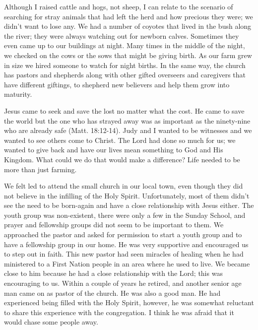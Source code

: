 \documentclass[twoside, 12pt]{book}
\begin{document}
Although I raised cattle and hogs, not sheep, I can relate to the scenario of searching for stray animals that had left the herd and how precious they were; we didn’t want to lose any. We had a number of coyotes that lived in the bush along the river; they were always watching out for newborn calves. Sometimes they even came up to our buildings at night. Many times in the middle of the night, we checked on the cows or the sows that might be giving birth. As our farm grew in size we hired someone to watch for night births. In the same way, the church has pastors and shepherds along with other gifted overseers and caregivers that have different giftings, to shepherd new believers and help them grow into maturity.

Jesus came to seek and save the lost no matter what the cost. He came to save the world but the one who has strayed away was as important as the ninety-nine who are already safe (Matt. 18:12-14). Judy and I wanted to be witnesses and we wanted to see others come to Christ. The Lord had done so much for us; we wanted to give back and have our lives mean something to God and His Kingdom. What could we do that would make a difference? Life needed to be more than just farming.

We felt led to attend the small church in our local town, even though they did not believe in the infilling of the Holy Spirit. Unfortunately, most of them didn't see the need to be born-again and have a close relationship with Jesus either. The youth group was non-existent, there were only a few in the Sunday School, and  prayer and fellowship groups did not seem to be important to them. We approached the pastor and asked for permission to start a youth group and to have a fellowship group in our home. He was very supportive and encouraged us to step out in faith. This new pastor had seen miracles of healing when he had ministered to a First Nation people in an area where he used to live. We became close to him because he had a close relationship with the Lord; this was encouraging to us. Within a couple of years he retired, and another senior age man came on as pastor of the church. He was also a good man. He had experienced being filled with the Holy Spirit, however, he was somewhat reluctant to share this experience with the congregation. I think he was afraid that it would chase some people away. 
\end{document}
